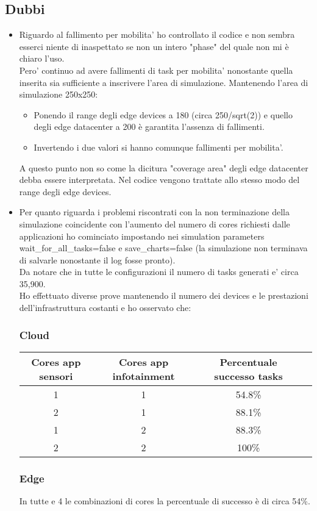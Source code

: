 \documentclass[12pt, a4paper]{report} %
\begin{document}
\subsection*{Dubbi}
\begin{itemize}
\item Riguardo al fallimento per mobilita' ho controllato il codice e non sembra esserci niente di inaspettato se non un intero "phase" del quale non mi è chiaro l'uso.\\
Pero' continuo ad avere fallimenti di task per mobilita' nonostante quella inserita sia sufficiente a inscrivere l'area di simulazione.
Mantenendo l'area di simulazione 250x250:
\begin{itemize}
	\item Ponendo il range degli edge devices a 180 (circa 250/sqrt(2)) e quello degli edge datacenter a 200 è garantita l'assenza di fallimenti.
	\item Invertendo i due valori si hanno comunque fallimenti per mobilita'.
\end{itemize}
A questo punto non so come la dicitura "coverage area" degli edge datacenter debba essere interpretata.
Nel codice vengono trattate allo stesso modo del range degli edge devices.
\item Per quanto riguarda i problemi riscontrati con la non terminazione della simulazione coincidente con l'aumento del numero di cores richiesti dalle applicazioni ho cominciato impostando nei simulation parameters wait\_for\_all\_tasks=false e save\_charts=false (la simulazione non terminava di salvarle nonostante il log fosse pronto).\\
Da notare che in tutte le configurazioni il numero di tasks generati e' circa 35,900.\\
Ho effettuato diverse prove mantenendo il numero dei devices e le prestazioni dell'infrastruttura costanti e ho osservato che:\\
\subsubsection*{Cloud}
\begin{tabular}{| c | c | c || c ||} %
		\hline
		Cores app sensori & Cores app infotainment & Percentuale successo tasks\\ [1ex] 
		\hline
		\hline
		1 & 1 & 54.8\%\\
		\hline
		2 & 1 & 88.1\%\\
		\hline
		1 & 2 & 88.3\%\\
		\hline
		2 & 2 & 100\%\\
		\hline
	\end{tabular}


\subsubsection*{Edge}
In tutte e 4 le combinazioni di cores la percentuale di successo è di circa 54\%.
\end{itemize}
\end{document}
